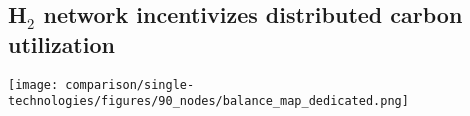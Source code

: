 \documentclass[twocolumn]{article}
\newcommand{\COtwo}{CO$_2$}
\newcommand{\Htwo}{H$_2$}
\newcommand{\modBase}{Baseline model}
\newcommand{\modCO}{CO$_2$\=/Grid model}
\newcommand{\modH}{H$_2$\=/Grid model}
\begin{document}





\subsection*{\Htwo{} network incentivizes distributed carbon utilization}\label{subsec:H2}

\begin{figure*}[ht!]
    \centering
    \texttt{[image: comparison/single-technologies/figures/90\_nodes/balance\_map\_dedicated.png]}
    \caption{Optimal operation per sector for a net-zero energy system in Europe with average production on the left and average consumption on the right for both, (a) the \COtwo{} sector in the \modCO{} and (b) the \Htwo{} sector in the \modH{}.}
    \label{fig:balance_map}
\end{figure*}
\end{document}
